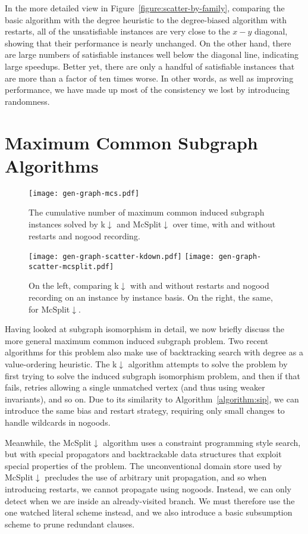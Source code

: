 \documentclass[a4paper,UKenglish]{lipics-v2018}
\newcommand{\figureref}[1]{Figure~\ref{#1}}
\newcommand{\algorithmref}[1]{Algorithm~\ref{#1}}
\begin{document}
In the more detailed view in \figureref{figure:scatter-by-family}, comparing the basic algorithm with the
degree heuristic to the degree-biased algorithm with restarts, all of the unsatisfiable instances
are very close to the $x-y$ diagonal, showing that their performance is nearly unchanged. On the
other hand, there are large numbers of satisfiable instances well below the diagonal line,
indicating large speedups.  Better yet, there are only a handful of satisfiable instances that are
more than a factor of ten times worse. In other words, as well as improving performance, we have
made up most of the consistency we lost by introducing randomness.

\section{Maximum Common Subgraph Algorithms}

\begin{figure}[tb]
    \centering
    \texttt{[image: gen-graph-mcs.pdf]}
    \caption{The cumulative number of maximum common induced subgraph instances solved by
    k${\downarrow}$ and McSplit${\downarrow}$ over time, with and without restarts and nogood
    recording.}\label{figure:mcs}
\end{figure}

\begin{figure}[tb]
    \texttt{[image: gen-graph-scatter-kdown.pdf]}
    \hfill
    \texttt{[image: gen-graph-scatter-mcsplit.pdf]}
    \caption{On the left, comparing k${\downarrow}$ with and without restarts and nogood recording on an instance
    by instance basis. On the right, the same, for McSplit${\downarrow}$.}\label{figure:mcsplitandkdown}
\end{figure}

Having looked at subgraph isomorphism in detail, we now briefly discuss the more general maximum
common induced subgraph problem.  Two recent algorithms for this problem also make use of
backtracking search with degree as a value-ordering heuristic. The k${\downarrow}$ algorithm
\cite{DBLP:conf/aaai/HoffmannMR17} attempts to solve the problem by first trying to solve the
induced subgraph isomorphism problem, and then if that fails, retries allowing a single unmatched
vertex (and thus using weaker invariants), and so on. Due to its similarity to \algorithmref{algorithm:sip},
we can introduce the same bias and restart strategy, requiring only small changes
to handle wildcards in nogoods.

Meanwhile, the McSplit${\downarrow}$ algorithm
\cite{DBLP:conf/ijcai/McCreeshPT17} uses a constraint programming style search, but with special
propagators and backtrackable data structures that exploit special properties of the problem. The
unconventional domain store used by McSplit${\downarrow}$ precludes the use of arbitrary unit
propagation, and so when introducing restarts, we cannot propagate using nogoods.  Instead, we can
only detect when we are inside an already-visited branch.  We must therefore use the one watched
literal scheme instead, and we also introduce a basic subsumption scheme to prune redundant clauses.
\end{document}
